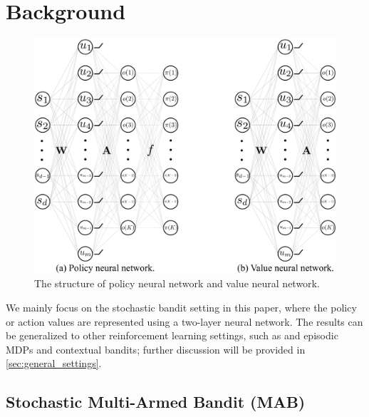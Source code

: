 \section{Background}
\label{sec:background}

\begin{figure}[t]
	\begin{center}
		\centerline{\includegraphics[width=1.0\columnwidth]{nn_policy_value_vertical_aistats.pdf}}
		\caption{The structure of policy neural network and value neural network.}
		\label{fig:nn_policy_value}
	\end{center}
	\vskip -0.2in
\end{figure}

We mainly focus on the stochastic bandit setting in this paper, where the policy or action values are represented using a two-layer neural network.  
The results can be generalized to other reinforcement learning settings, such as and episodic MDPs and contextual bandits; further discussion will be provided in \cref{sec:general_settings}.

\subsection{Stochastic Multi-Armed Bandit (MAB)}
\label{subsec:settings}

